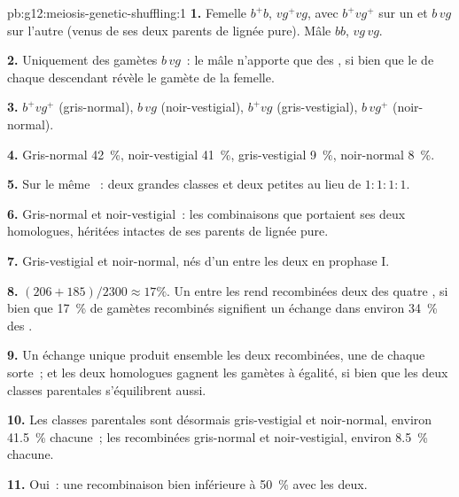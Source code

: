 \begin{solution}{pb:g12:meiosis-genetic-shuffling:1}
\textbf{1.} Femelle $b^+b$, $vg^+vg$, avec $b^+vg^+$ sur un 
et $b\,vg$ sur l'autre (venus de ses deux parents de lignée pure).
Mâle $bb$, $vg\,vg$.

\textbf{2.} Uniquement des gamètes $b\,vg$~: le mâle n'apporte que des
 , si bien que le  de chaque descendant révèle
le gamète de la femelle.

\textbf{3.} $b^+vg^+$ (gris-normal), $b\,vg$ (noir-vestigial),
$b^+vg$ (gris-vestigial), $b\,vg^+$ (noir-normal).

\textbf{4.} Gris-normal 42~\%, noir-vestigial 41~\%, gris-vestigial
9~\%, noir-normal 8~\%.

\textbf{5.} Sur le même ~: deux grandes classes et deux
petites au lieu de $1:1:1:1$.

\textbf{6.} Gris-normal et noir-vestigial~: les combinaisons que
portaient ses deux homologues, héritées intactes de ses parents de
lignée pure.

\textbf{7.} Gris-vestigial et noir-normal, nés d'un  entre
les deux  en prophase I.

\textbf{8.} $(206 + 185)/2300 \approx 17\%$. Un  entre les
 rend recombinées deux des quatre , si bien que 17~\%
de gamètes recombinés signifient un échange dans environ 34~\% des
.

\textbf{9.} Un échange unique produit ensemble les deux 
recombinées, une de chaque sorte~; et les deux homologues gagnent les
gamètes à égalité, si bien que les deux classes parentales
s'équilibrent aussi.

\textbf{10.} Les classes parentales sont désormais gris-vestigial et
noir-normal, environ 41.5~\% chacune~; les recombinées gris-normal et
noir-vestigial, environ 8.5~\% chacune.

\textbf{11.} Oui~: une recombinaison bien inférieure à 50~\% avec les deux.


\end{solution}
